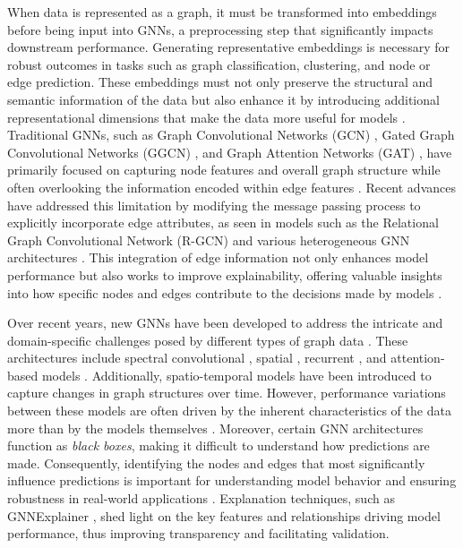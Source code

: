 \documentclass[journal]{IEEEtran}
\begin{document}
When data is represented as a graph, it must be transformed into embeddings before being input into GNNs, a preprocessing step that significantly impacts downstream performance. Generating representative embeddings is necessary for robust outcomes in tasks such as graph classification, clustering, and node or edge prediction. These embeddings must not only preserve the structural and semantic information of the data but also enhance it by introducing additional representational dimensions that make the data more useful for models \cite{Xiao2023Heterogeneous}. Traditional GNNs, such as Graph Convolutional Networks (GCN) \cite{kipf2016semi}, Gated Graph Convolutional Networks (GGCN) \cite{li2015gated}, and Graph Attention Networks (GAT) \cite{velivckovic2017graph}, have primarily focused on capturing node features and overall graph structure while often overlooking the information encoded within edge features \cite{gong2019exploiting}. Recent advances have addressed this limitation by modifying the message passing process to explicitly incorporate edge attributes, as seen in models such as the Relational Graph Convolutional Network (R-GCN) \cite{schlichtkrull2018modeling} and various heterogeneous GNN architectures \cite{Zhu2019Relation}. This integration of edge information not only enhances model performance but also works to improve explainability, offering valuable insights into how specific nodes and edges contribute to the decisions made by models \cite{Yuan2023Explainability}.


Over recent years, new GNNs have been developed to address the intricate and domain-specific challenges posed by different types of graph data \cite{li2024survey}. These architectures include spectral convolutional \cite{defferrard2016convolutional}, spatial \cite{hamilton2017inductive}, recurrent \cite{li2015gated}, and attention-based models \cite{velivckovic2017graph}. Additionally, spatio-temporal models \cite{huang2024dst} have been introduced to capture changes in graph structures over time. However, performance variations between these models are often driven by the inherent characteristics of the data more than by the models themselves \cite{Zhou2020Review}.
Moreover, certain GNN architectures function as \textit{black boxes}, making it difficult to understand how predictions are made. Consequently, identifying the nodes and edges that most significantly influence predictions is important for understanding model behavior and ensuring robustness in real-world applications \cite{Zhang2024TrustworthyGNNs}. Explanation techniques, such as GNNExplainer \cite{ying2019gnnexplainer}, shed light on the key features and relationships driving model performance, thus improving transparency and facilitating validation.
\end{document}
